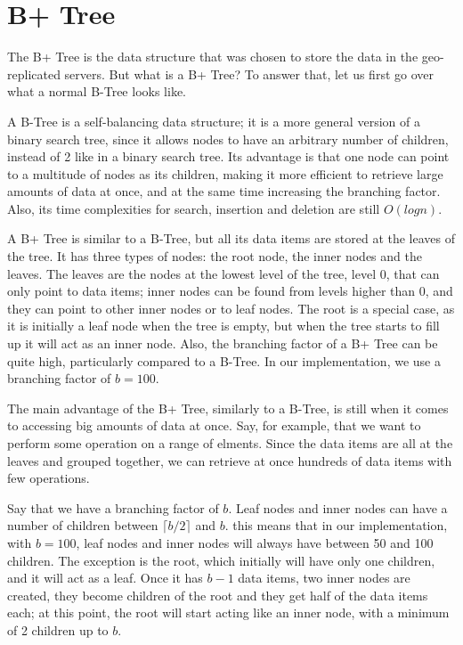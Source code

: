 \section{B+ Tree}\label{sec:b+tree}
The B+ Tree is the data structure that was chosen to store the data in the geo-replicated servers. 
But what is a B+ Tree? To answer that, let us first go over what a normal B-Tree looks like. 

A B-Tree is a self-balancing data structure; it is a more general version of a binary search tree, since it allows nodes to have an arbitrary number of children, instead of 2 like in a binary search tree. Its advantage is that one node can point to a multitude of nodes as its children, making it more efficient to retrieve large amounts of data at once, and at the same time increasing the branching factor. Also, its time complexities for search, insertion and deletion are still $O(log n)$.

A B+ Tree is similar to a B-Tree, but all its data items are stored at the leaves of the tree. It has three types of nodes: the root node, the inner nodes and the leaves. The leaves are the nodes at the lowest level of the tree, level 0, that can only point to data items; inner nodes can be found from levels higher than 0, and they can point to other inner nodes or to leaf nodes. The root is a special case, as it is initially a leaf node when the tree is empty, but when the tree starts to fill up it will act as an inner node. Also, the branching factor of a B+ Tree can be quite high, particularly compared to a B-Tree. In our implementation, we use a branching factor of $b=100$.

The main advantage of the B+ Tree, similarly to a B-Tree, is still when it comes to accessing big amounts of data at once. Say, for example, that we want to perform some operation on a range of elments. Since the data items are all at the leaves and grouped together, we can retrieve at once hundreds of data items with few operations.

Say that we have a branching factor of $b$. Leaf nodes and inner nodes can have a number of children between $\lceil b/2 \rceil$ and $b$. this means that in our implementation, with $b=100$, leaf nodes and inner nodes will always have between 50 and 100 children. The exception is the root, which initially will have only one children, and it will act as a leaf. Once it has $b-1$ data items, two inner nodes are created, they become children of the root and they get half of the data items each; at this point, the root will start acting like an inner node, with a minimum of 2 children up to $b$.

